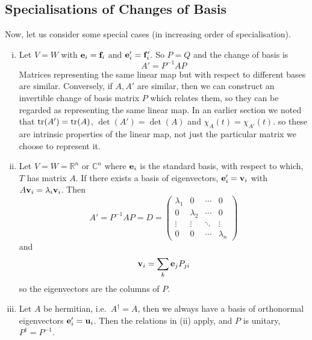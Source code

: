 \subsection{Specialisations of Changes of Basis}
Now, let us consider some special cases (in increasing order of specialisation).
\begin{enumerate}[(i)]
	\item Let \(V=W\) with \(\vb e_i = \vb f_i\) and \(\vb e'_i = \vb f'_i\). So \(P=Q\) and the change of basis is
	      \[ A' = P^{-1}AP \]
	      Matrices representing the same linear map but with respect to different bases are similar. Conversely, if \(A, A'\) are similar, then we can construct an invertible change of basis matrix \(P\) which relates them, so they can be regarded as representing the same linear map. In an earlier section we noted that \(\tr(A') = \tr(A)\), \(\det(A') = \det(A)\) and \(\chi_A(t) = \chi_{A'}(t)\). so these are intrinsic properties of the linear map, not just the particular matrix we choose to represent it.
	\item Let \(V=W=\mathbb R^n\) or \(\mathbb C^n\) where \(\vb e_i\) is the standard basis, with respect to which, \(T\) has matrix \(A\). If there exists a basis of eigenvectors, \(\vb e'_i = \vb v_i\) with \(A\vb v_i = \lambda_i\vb v_i\). Then
	      \[ A' = P^{-1}AP = D = \begin{pmatrix}
			      \lambda_1 & 0         & \cdots & 0         \\
			      0         & \lambda_2 & \cdots & 0         \\
			      \vdots    & \vdots    & \ddots & \vdots    \\
			      0         & 0         & \cdots & \lambda_n
		      \end{pmatrix} \]
	      and
	      \[ \vb v_i = \sum_k \vb e_j P_{ji} \]
	      so the eigenvectors are the columns of \(P\).
	\item Let \(A\) be hermitian, i.e.\ \(A^\dagger = A\), then we always have a basis of orthonormal eigenvectors \(\vb e'_i = \vb u_i\). Then the relations in (ii) apply, and \(P\) is unitary, \(P^\dagger = P^{-1}\).
\end{enumerate}

